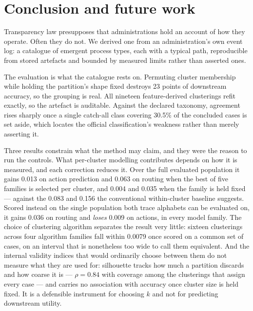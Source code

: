 \section{Conclusion and future work}\label{sec:conclusion}

Transparency law presupposes that administrations hold an account of how they operate. Often
they do not. We derived one from an administration's own event log: a catalogue of emergent
process types, each with a typical path, reproducible from stored artefacts and bounded by
measured limits rather than asserted ones.

The evaluation is what the catalogue rests on. Permuting cluster membership while holding the
partition's shape fixed destroys 23 points of downstream accuracy, so the grouping is real. All
nineteen feature-derived clusterings refit exactly, so the artefact is auditable. Against the declared
taxonomy, agreement rises sharply once a single catch-all class covering 30.5\% of the concluded cases is set
aside, which locates the official classification's weakness rather than merely asserting it.

Three results constrain what the method may claim, and they were the reason to run the controls.
What per-cluster modelling contributes depends on how it is measured, and each correction
reduces it. Over the full evaluated population it gains 0.013 on action prediction and 0.063 on
routing when the best of five families is selected per cluster, and 0.004 and 0.035 when the
family is held fixed --- against the 0.083 and 0.156 the conventional within-cluster baseline
suggests. Scored instead on the single population both trace alphabets can be evaluated on, it
gains 0.036 on routing and \emph{loses} 0.009 on actions, in every model family. The
choice of clustering algorithm separates the result very little: sixteen clusterings across four
algorithm families fall within 0.0079 once scored on a common set of cases, on an interval that
is nonetheless too wide to call them equivalent. And the internal validity indices that would
ordinarily choose between them do not measure what they are used for: silhouette tracks how much
a partition discards and how coarse it is --- $\rho = 0.84$ with coverage among the clusterings
that assign every case --- and carries no association with accuracy once cluster size is held
fixed. It is a defensible instrument for choosing $k$ and not for predicting downstream utility.

